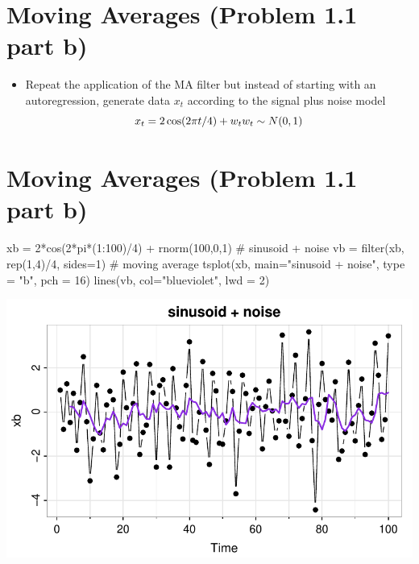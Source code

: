 \documentclass[
  letterpaper,
  DIV=11,
  numbers=noendperiod]{scrreprt}
\newenvironment{Shaded}{\begin{snugshade}}{\end{snugshade}}
\newcommand{\AttributeTok}[1]{\textcolor[rgb]{0.40,0.45,0.13}{#1}}
\newcommand{\CommentTok}[1]{\textcolor[rgb]{0.37,0.37,0.37}{#1}}
\newcommand{\DecValTok}[1]{\textcolor[rgb]{0.68,0.00,0.00}{#1}}
\newcommand{\FunctionTok}[1]{\textcolor[rgb]{0.28,0.35,0.67}{#1}}
\newcommand{\NormalTok}[1]{\textcolor[rgb]{0.00,0.23,0.31}{#1}}
\newcommand{\OtherTok}[1]{\textcolor[rgb]{0.00,0.23,0.31}{#1}}
\newcommand{\SpecialCharTok}[1]{\textcolor[rgb]{0.37,0.37,0.37}{#1}}
\newcommand{\StringTok}[1]{\textcolor[rgb]{0.13,0.47,0.30}{#1}}
\providecommand{\tightlist}{%
  \setlength{\itemsep}{0pt}\setlength{\parskip}{0pt}}\usepackage{longtable,booktabs,array}
\begin{document}
\section{Moving Averages (Problem 1.1 part
b)}\label{moving-averages-problem-1.1-part-b}

\begin{itemize}
\tightlist
\item
  Repeat the application of the MA filter but instead of starting with
  an autoregression, generate data \(x_t\) according to the signal plus
  noise model \[
  x_t = 2\cos(2\pi t/4) + w_t\\ w_t \sim N(0,1)
  \]
\end{itemize}

\section{Moving Averages (Problem 1.1 part
b)}\label{moving-averages-problem-1.1-part-b-1}

\begin{Shaded}
\begin{Highlighting}[]
\NormalTok{xb }\OtherTok{=} \DecValTok{2}\SpecialCharTok{*}\FunctionTok{cos}\NormalTok{(}\DecValTok{2}\SpecialCharTok{*}\NormalTok{pi}\SpecialCharTok{*}\NormalTok{(}\DecValTok{1}\SpecialCharTok{:}\DecValTok{100}\NormalTok{)}\SpecialCharTok{/}\DecValTok{4}\NormalTok{) }\SpecialCharTok{+} \FunctionTok{rnorm}\NormalTok{(}\DecValTok{100}\NormalTok{,}\DecValTok{0}\NormalTok{,}\DecValTok{1}\NormalTok{) }\CommentTok{\# sinusoid + noise}
\NormalTok{vb }\OtherTok{=} \FunctionTok{filter}\NormalTok{(xb, }\FunctionTok{rep}\NormalTok{(}\DecValTok{1}\NormalTok{,}\DecValTok{4}\NormalTok{)}\SpecialCharTok{/}\DecValTok{4}\NormalTok{, }\AttributeTok{sides=}\DecValTok{1}\NormalTok{) }\CommentTok{\# moving average}
\FunctionTok{tsplot}\NormalTok{(xb, }\AttributeTok{main=}\StringTok{"sinusoid + noise"}\NormalTok{, }\AttributeTok{type =} \StringTok{"b"}\NormalTok{, }\AttributeTok{pch =} \DecValTok{16}\NormalTok{)}
\FunctionTok{lines}\NormalTok{(vb, }\AttributeTok{col=}\StringTok{"blueviolet"}\NormalTok{, }\AttributeTok{lwd =} \DecValTok{2}\NormalTok{)}
\end{Highlighting}
\end{Shaded}

\includegraphics{LectureNotes/Lecture2_files/figure-pdf/unnamed-chunk-16-1.pdf}
\end{document}
